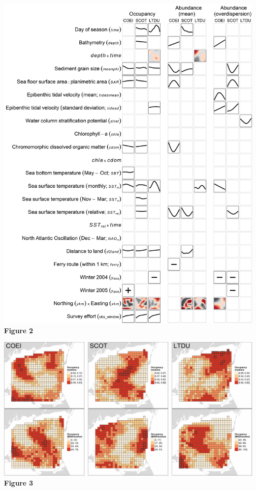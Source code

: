 \newpage

\includegraphics{./Figures/Covariate_effects.png}\\
\textbf{Figure 2}

\newpage

\includegraphics{./Figures/occupancy_maps_reduced.png}\\
\textbf{Figure 3}

